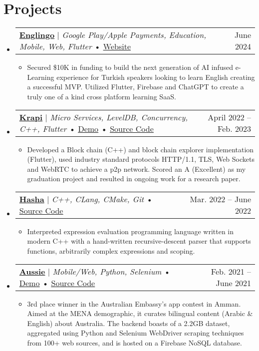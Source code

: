 \documentclass[letterpaper,11pt]{article}
\makeatletter
\newcommand{\resumeItem}[1]{
  \item\small{
    {#1 \vspace{0.5pt}}
  }
}
\newcommand{\resumeProjectHeading}[2]{
    \item
    \begin{tabular*}{0.97\textwidth}{l@{\extracolsep{\fill}}r}
      \small#1 & #2 \\
    \end{tabular*}\vspace{-7pt}
}
\newcommand{\resumeSubHeadingListStart}{\begin{itemize}[leftmargin=0.0in, label={}]}
\newcommand{\resumeSubHeadingListEnd}{\end{itemize}}
\newcommand{\resumeItemListStart}{\vspace{2pt}\begin{itemize}}
\newcommand{\resumeItemListEnd}{\end{itemize}\vspace{-5pt}}
\makeatother
\begin{document}
\section{Projects}
   \resumeSubHeadingListStart
   \resumeProjectHeading
          {\href{https://englingo.com}{\textbf{Englingo}} $|$ \emph{Google Play/Apple Payments, Education, Mobile, Web, Flutter} • \href{https://englingo.com}{\underline{Website}}}{June 2024}
          \resumeItemListStart
                \resumeItem{
                    Secured \$10K in funding to build the next generation of AI infused e-Learning experience for Turkish speakers looking to learn English creating a successful MVP. Utilized Flutter, Firebase and ChatGPT to create a truly one of a kind cross platform learning SaaS.
                }
          \resumeItemListEnd
    \resumeProjectHeading
          {\href{https://github.com/KrapiOrg}{\textbf{Krapi}} $|$ \emph{Micro Services, LevelDB, Concurrency, C++, Flutter} • \href{https://youtu.be/NvcLwSh_mIw}{\underline{Demo}} • \href{https://github.com/KrapiOrg}{\underline{Source Code}}}{April 2022 -- Feb. 2023}
          \resumeItemListStart
                \resumeItem{
                    Developed a Block chain (C++) and block chain explorer implementation (Flutter), used industry standard protocols HTTP/1.1, TLS, Web Sockets and WebRTC to achieve a p2p network. Scored an A (Excellent) as my graduation project and resulted in ongoing work for a research paper.
                }
          \resumeItemListEnd
             \resumeProjectHeading      
        {\href{https://github.com/hashem78/hasha}{\textbf{Hasha}} $|$ \emph{C++, CLang, CMake, Git} • \href{https://github.com/hashem78/hasha}{\underline{Source Code}}}{Mar. 2022  -- June 2022}
          \resumeItemListStart
            \resumeItem{ Interpreted expression evaluation programming language written in modern C++ with a hand-written recursive-descent parser that supports functions, arbitrarily complex expressions and scoping.}
          \resumeItemListEnd
        \resumeProjectHeading 
    {\href{https://github.com/hashem78/aussie}{\textbf{Aussie}} $|$ \emph{Mobile/Web, Python, Selenium} • \href{https://github.com/hashem78/aussie/tree/main\#screenshots}{\underline{Demo}} • \href{https://github.com/hashem78/aussie}{\underline{Source Code}}}{Feb. 2021  -- June 2021}
          \resumeItemListStart
                \resumeItem{
                    3rd place winner in the Australian Embassy's app contest in Amman. Aimed at the MENA demographic, it curates bilingual content (Arabic \& English) about Australia. The backend boasts of a 2.2GB dataset, aggregated using Python and Selenium WebDriver scraping techniques from 100+ web sources, and is hosted on a Firebase NoSQL database.
                }
        \resumeItemListEnd
    \resumeSubHeadingListEnd

 
\end{document}
